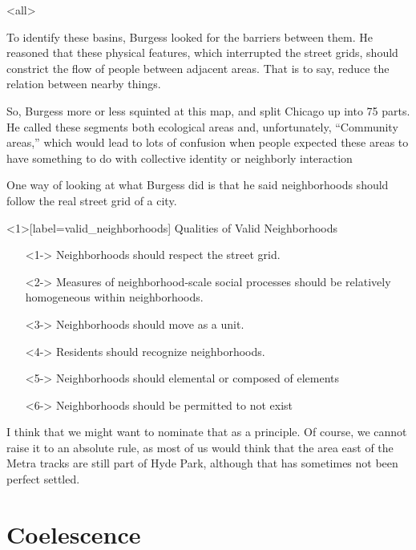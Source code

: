 \mode<all>{

To identify these basins, Burgess looked for the barriers between
them. He reasoned that these physical features, which interrupted the
street grids, should constrict the flow of people between adjacent
areas. That is to say, reduce the relation between nearby things.

So, Burgess more or less squinted at this map, and split Chicago up
into 75 parts. He called these segments both ecological
areas and, unfortunately, ``Community areas,'' which would lead to
lots of confusion when people expected these areas to have something
to do with collective identity or neighborly interaction

One way of looking at what Burgess did is that he said neighborhoods
should follow the real street grid of a city.

 {
  \begin{frame}<1>[label=valid_neighborhoods]
    Qualities of Valid Neighborhoods
    \begin{itemize}
    \item[]<1-> Neighborhoods should respect the street grid.
    \item[]<2-> Measures of neighborhood-scale social processes should
      be relatively homogeneous within neighborhoods.
    \item[]<3-> Neighborhoods should move as a unit.
    \item[]<4-> Residents should recognize neighborhoods.
    \item[]<5-> Neighborhoods should elemental or composed of elements
    \item[]<6-> Neighborhoods should be permitted to not exist
    \end{itemize}
  \end{frame}
}
\begin{figure}[h!]
\centering
{}
\end{figure}

I think that we might want to nominate that as a principle. Of course,
we cannot raise it to an absolute rule, as most of us would think that
the area east of the Metra tracks are still part of Hyde Park,
although that has sometimes not been perfect settled.

\section{Coelescence}

}
